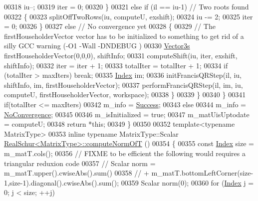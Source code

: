 \begin{DoxyCode}
00318         iu--;
00319         iter = 0;
00320       \}
00321       \textcolor{keywordflow}{else} \textcolor{keywordflow}{if} (il == iu-1) \textcolor{comment}{// Two roots found}
00322       \{
00323         splitOffTwoRows(iu, computeU, exshift);
00324         iu -= 2;
00325         iter = 0;
00326       \}
00327       \textcolor{keywordflow}{else} \textcolor{comment}{// No convergence yet}
00328       \{
00329         \textcolor{comment}{// The firstHouseholderVector vector has to be initialized to something to get rid of a silly GCC
       warning (-O1 -Wall -DNDEBUG )}
00330         \hyperlink{group___core___module}{Vector3s} firstHouseholderVector(0,0,0), shiftInfo;
00331         computeShift(iu, iter, exshift, shiftInfo);
00332         iter = iter + 1;
00333         totalIter = totalIter + 1;
00334         \textcolor{keywordflow}{if} (totalIter > maxIters) \textcolor{keywordflow}{break};
00335         \hyperlink{group___eigenvalues___module_a8bd4653e2d9569a44ecc95e746422d3f}{Index} im;
00336         initFrancisQRStep(il, iu, shiftInfo, im, firstHouseholderVector);
00337         performFrancisQRStep(il, im, iu, computeU, firstHouseholderVector, workspace);
00338       \}
00339     \}
00340   \}
00341   \textcolor{keywordflow}{if}(totalIter <= maxIters)
00342     m\_info = \hyperlink{group__enums_gga85fad7b87587764e5cf6b513a9e0ee5ea52581b035f4b59c203b8ff999ef5fcea}{Success};
00343   \textcolor{keywordflow}{else}
00344     m\_info = \hyperlink{group__enums_gga85fad7b87587764e5cf6b513a9e0ee5eaba1c8763d1179778070f365ecc4157a8}{NoConvergence};
00345 
00346   m\_isInitialized = \textcolor{keyword}{true};
00347   m\_matUisUptodate = computeU;
00348   \textcolor{keywordflow}{return} *\textcolor{keyword}{this};
00349 \}
00350 
00352 \textcolor{keyword}{template}<\textcolor{keyword}{typename} MatrixType>
00353 \textcolor{keyword}{inline} \textcolor{keyword}{typename} MatrixType::Scalar \hyperlink{group___eigenvalues___module_class_eigen_1_1_real_schur}{RealSchur<MatrixType>::computeNormOfT}
      ()
00354 \{
00355   \textcolor{keyword}{const} \hyperlink{group___eigenvalues___module_a8bd4653e2d9569a44ecc95e746422d3f}{Index} size = m\_matT.cols();
00356   \textcolor{comment}{// FIXME to be efficient the following would requires a triangular reduxion code}
00357   \textcolor{comment}{// Scalar norm = m\_matT.upper().cwiseAbs().sum() }
00358   \textcolor{comment}{//               + m\_matT.bottomLeftCorner(size-1,size-1).diagonal().cwiseAbs().sum();}
00359   Scalar norm(0);
00360   \textcolor{keywordflow}{for} (\hyperlink{group___eigenvalues___module_a8bd4653e2d9569a44ecc95e746422d3f}{Index} j = 0; j < size; ++j)

\end{DoxyCode}
